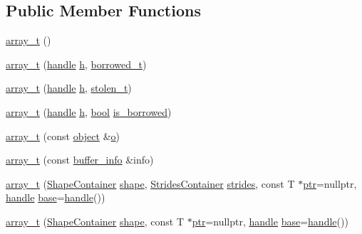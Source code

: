 \subsection*{Public Member Functions}
\begin{DoxyCompactItemize}
\item 
\mbox{\hyperlink{classarray__t_a8f6c17079f3e88320d6a8461c81d6542}{array\+\_\+t}} ()
\item 
\mbox{\hyperlink{classarray__t_a1572688dd276c040ecf7cf95bf71f99d}{array\+\_\+t}} (\mbox{\hyperlink{classhandle}{handle}} \mbox{\hyperlink{_s_d_l__opengl__glext_8h_afa0fb1b5e976920c0abeff2dca3ed774}{h}}, \mbox{\hyperlink{structobject_1_1borrowed__t}{borrowed\+\_\+t}})
\item 
\mbox{\hyperlink{classarray__t_a6173d09655f37b338be294b3fb9c5fd6}{array\+\_\+t}} (\mbox{\hyperlink{classhandle}{handle}} \mbox{\hyperlink{_s_d_l__opengl__glext_8h_afa0fb1b5e976920c0abeff2dca3ed774}{h}}, \mbox{\hyperlink{structobject_1_1stolen__t}{stolen\+\_\+t}})
\item 
\mbox{\hyperlink{classarray__t_a38d43f3aa5a9f571806c1f16c0d0cdbe}{array\+\_\+t}} (\mbox{\hyperlink{classhandle}{handle}} \mbox{\hyperlink{_s_d_l__opengl__glext_8h_afa0fb1b5e976920c0abeff2dca3ed774}{h}}, \mbox{\hyperlink{asdl_8h_af6a258d8f3ee5206d682d799316314b1}{bool}} \mbox{\hyperlink{classobject_a4ebda2f2d08435f4d70d822908d7e431}{is\+\_\+borrowed}})
\item 
\mbox{\hyperlink{classarray__t_a85907bc49d323017981e8987e55405b5}{array\+\_\+t}} (const \mbox{\hyperlink{classobject}{object}} \&\mbox{\hyperlink{abstract_8h_a70a0763575096c5545f2232a32ec302a}{o}})
\item 
\mbox{\hyperlink{classarray__t_ab16a1d127243be1853d6c03c7c853160}{array\+\_\+t}} (const \mbox{\hyperlink{structbuffer__info}{buffer\+\_\+info}} \&info)
\item 
\mbox{\hyperlink{classarray__t_abacd58d596a65f7c9693b7d61285af5a}{array\+\_\+t}} (\mbox{\hyperlink{classarray_a3378d7821106645fa3a88c5222e127e0}{Shape\+Container}} \mbox{\hyperlink{classarray_a084781a3d2cb3ea60ab7bcf16c30ee31}{shape}}, \mbox{\hyperlink{classarray_a8ba4f30946f0bc69ec937160c9fb10e1}{Strides\+Container}} \mbox{\hyperlink{_s_d_l__opengl__glext_8h_a0ee97b40d6208eba611c597d83b029a5}{strides}}, const T $\ast$\mbox{\hyperlink{classhandle_afcd412ba4cbffd7d1e3c9338746b2682}{ptr}}=nullptr, \mbox{\hyperlink{classhandle}{handle}} \mbox{\hyperlink{structbase}{base}}=\mbox{\hyperlink{classhandle}{handle}}())
\item 
\mbox{\hyperlink{classarray__t_a93a19b75568c0df2c021f6ca74f5c59f}{array\+\_\+t}} (\mbox{\hyperlink{classarray_a3378d7821106645fa3a88c5222e127e0}{Shape\+Container}} \mbox{\hyperlink{classarray_a084781a3d2cb3ea60ab7bcf16c30ee31}{shape}}, const T $\ast$\mbox{\hyperlink{classhandle_afcd412ba4cbffd7d1e3c9338746b2682}{ptr}}=nullptr, \mbox{\hyperlink{classhandle}{handle}} \mbox{\hyperlink{structbase}{base}}=\mbox{\hyperlink{classhandle}{handle}}())

\end{DoxyCompactItemize}
